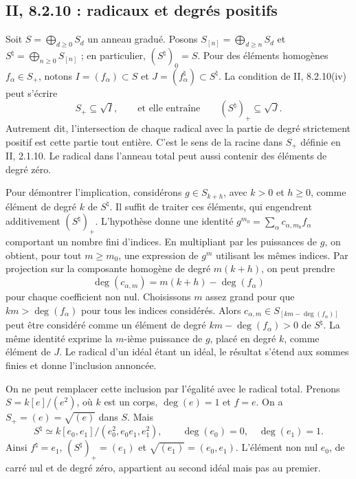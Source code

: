 \documentclass[11pt,a4paper]{article}
\begin{document}
\subsection{II, 8.2.10 : radicaux et degrés positifs}
\label{note:base2-positive-radical}

Soit $S=\bigoplus_{d\geq0}S_d$ un anneau gradué. Posons
$S_{[n]}=\bigoplus_{d\geq n}S_d$ et
$S^\natural=\bigoplus_{n\geq0}S_{[n]}$ ; en particulier,
$(S^\natural)_0=S$. Pour des éléments homogènes
$f_\alpha\in S_+$, notons $I=(f_\alpha)\subset S$ et
$J=(f_\alpha^\natural)\subset S^\natural$.
La condition de II, 8.2.10(iv) peut s'écrire
\[
 S_+\subseteq\sqrt I,
 \qquad\text{et elle entraîne}\qquad
 (S^\natural)_+\subseteq\sqrt J.
\]
Autrement dit, l'intersection de chaque radical avec la partie
de degré strictement positif est cette partie tout entière.
C'est le sens de la racine dans $S_+$ définie en II, 2.1.10.
Le radical dans l'anneau total peut aussi contenir des éléments
de degré zéro.

Pour démontrer l'implication, considérons $g\in S_{k+h}$,
avec $k>0$ et $h\geq0$, comme élément de degré $k$ de
$S^\natural$. Il suffit de traiter ces éléments, qui engendrent
additivement $(S^\natural)_+$. L'hypothèse donne une identité
$g^{m_0}=\sum_\alpha c_{\alpha,m_0}f_\alpha$ comportant un
nombre fini d'indices. En multipliant par les puissances de $g$,
on obtient, pour tout $m\geq m_0$, une expression de $g^m$
utilisant les mêmes indices. Par projection sur la composante
homogène de degré $m(k+h)$, on peut prendre
\[
 \deg(c_{\alpha,m})=m(k+h)-\deg(f_\alpha)
\]
pour chaque coefficient non nul. Choisissons $m$ assez grand
pour que $km>\deg(f_\alpha)$ pour tous les indices considérés.
Alors $c_{\alpha,m}\in S_{[km-\deg(f_\alpha)]}$ peut être
considéré comme un élément de degré $km-\deg(f_\alpha)>0$
de $S^\natural$. La même identité exprime la $m$-ième
puissance de $g$, placé en degré $k$, comme élément de $J$.
Le radical d'un idéal étant un idéal, le résultat s'étend aux
sommes finies et donne l'inclusion annoncée.

On ne peut remplacer cette inclusion par l'égalité avec le
radical total. Prenons $S=k[e]/(e^2)$, où $k$ est un corps,
$\deg(e)=1$ et $f=e$. On a $S_+=(e)=\sqrt{(e)}$ dans $S$.
Mais
\[
 S^\natural\simeq k[e_0,e_1]/(e_0^2,e_0e_1,e_1^2),
 \qquad \deg(e_0)=0,\quad\deg(e_1)=1.
\]
Ainsi $f^\natural=e_1$, $(S^\natural)_+=(e_1)$ et
$\sqrt{(e_1)}=(e_0,e_1)$. L'élément non nul $e_0$, de carré
nul et de degré zéro, appartient au second idéal mais pas au
premier.
\end{document}
